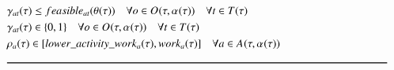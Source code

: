 \begin{alignat}{2}
	& \VarSupervisorAssignment{\ElementActivity}{\ElementTechnician} \leq \ParFeasible  \quad \forall \ElementOperation \in \SetOperation{}{\VarStrategicWorkOrderAssignment{}{}} \quad \forall \ElementTechnician \in \SetTechnician \\
	& \VarSupervisorAssignment{\ElementActivity}{\ElementTechnician} \in \{0, 1\}  \quad \forall \ElementOperation \in \SetOperation{}{\VarStrategicWorkOrderAssignment{}{}} \quad \forall \ElementTechnician \in \SetTechnician \\ 
	& \VarActivityWork{\ElementActivity} \in [\ParLowerActivityWork, \ParOperationWork{\ElementActivity}]  \quad \forall \ElementActivity \in \SetActivity{\VarStrategicWorkOrderAssignment{}{}}{}\\ 
	& \text{\rule{\linewidth}{0.8pt}} \notag \label{}                                                                                                                                                                                                                                                                                                                                                                     \\ 
\end{alignat}
